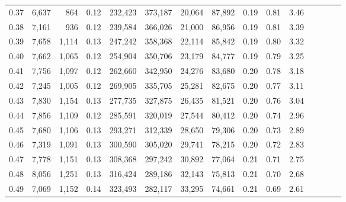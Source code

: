 \begin{tabular}{rrrcrrrrrrrrrrr}
0.37 &   6,637 &     864 &                                       0.12 &  232,423 &  373,187 &   20,064 &   87,892 &  0.19 &  0.81 &                         3.46 \\
0.38 &   7,161 &     936 &                                       0.12 &  239,584 &  366,026 &   21,000 &   86,956 &  0.19 &  0.81 &                         3.39 \\
0.39 &   7,658 &   1,114 &                                       0.13 &  247,242 &  358,368 &   22,114 &   85,842 &  0.19 &  0.80 &                         3.32 \\
0.40 &   7,662 &   1,065 &                                       0.12 &  254,904 &  350,706 &   23,179 &   84,777 &  0.19 &  0.79 &                         3.25 \\
0.41 &   7,756 &   1,097 &                                       0.12 &  262,660 &  342,950 &   24,276 &   83,680 &  0.20 &  0.78 &                         3.18 \\
0.42 &   7,245 &   1,005 &                                       0.12 &  269,905 &  335,705 &   25,281 &   82,675 &  0.20 &  0.77 &                         3.11 \\
0.43 &   7,830 &   1,154 &                                       0.13 &  277,735 &  327,875 &   26,435 &   81,521 &  0.20 &  0.76 &                         3.04 \\
0.44 &   7,856 &   1,109 &                                       0.12 &  285,591 &  320,019 &   27,544 &   80,412 &  0.20 &  0.74 &                         2.96 \\
0.45 &   7,680 &   1,106 &                                       0.13 &  293,271 &  312,339 &   28,650 &   79,306 &  0.20 &  0.73 &                         2.89 \\
0.46 &   7,319 &   1,091 &                                       0.13 &  300,590 &  305,020 &   29,741 &   78,215 &  0.20 &  0.72 &                         2.83 \\
0.47 &   7,778 &   1,151 &                                       0.13 &  308,368 &  297,242 &   30,892 &   77,064 &  0.21 &  0.71 &                         2.75 \\
0.48 &   8,056 &   1,251 &                                       0.13 &  316,424 &  289,186 &   32,143 &   75,813 &  0.21 &  0.70 &                         2.68 \\
0.49 &   7,069 &   1,152 &                                       0.14 &  323,493 &  282,117 &   33,295 &   74,661 &  0.21 &  0.69 &                         2.61 \\

\end{tabular}

